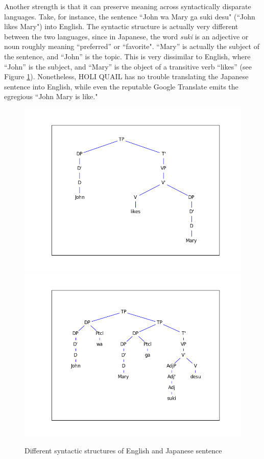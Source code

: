 \documentclass[11pt, oneside]{article}      %
\begin{document}
Another strength is that it can preserve meaning across syntactically disparate languages.  Take, for instance, the sentence ``John wa Mary ga suki desu" (``John likes Mary") into English.  The syntactic structure is actually very different between the two languages, since in Japanese, the word \textit{suki} is an adjective or noun roughly meaning ``preferred'' or ``favorite". ``Mary'' is actually the subject of the sentence, and ``John'' is the topic.  This is very dissimilar to English, where ``John'' is the subject, and ``Mary'' is the object of a transitive verb ``likes'' (see Figure \ref{eng_jap}).  Nonetheless, HOLI QUAIL has no trouble translating the Japanese sentence into English, while even the reputable Google Translate emits the egregious ``John Mary is like."

\begin{figure} [ht]
\centerline{
\includegraphics[scale=.5]{likes_eng_1.png}
\includegraphics[scale=.5]{likes_jap_1.png}}
\caption{Different syntactic structures of English and Japanese sentence} \label{eng_jap}
\end{figure}
\end{document}
